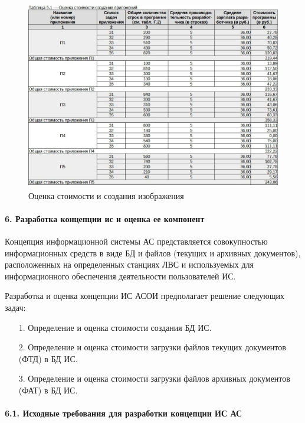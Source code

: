 \documentclass[12pt, a4paper, simple]{eskdtext}
\begin{document}
    \begin{figure}[ph!]
        \centering
        \includegraphics[width=16cm]
            {_docs/Таблица5-1ОценкаСтоимостиСозданияПриложений.jpg}
        \caption{Оценка стоимости и создания изображения}
    \end{figure}

    \newpage

    \paragraph{6. Разработка концепции ис и оценка ее компонент} \hspace{0pt}

    Концепция информационной системы АС представляется совокупностью информационных средств в виде БД и файлов (текущих и архивных документов), расположенных на определенных стан­циях ЛВС и используемых для информационного обеспечения деятельности пользователей ИС.

    Разработка и оценка концепции ИС АСОИ предполагает ре­шение следую­щих задач:
    \begin{enumerate}
        \item[1.] Определение и оценка стоимости создания БД ИС.
        \item[2.] Определение и оценка стоимости загрузки файлов текущих документов (ФТД) в БД ИС.
        \item[3.] Определение и оценка стоимости загрузки файлов архивных документов (ФАТ) в БД ИС.
    \end{enumerate}

    \paragraph{6.1. Исходные требования для разработки концепции ИС АС} \hspace{0pt}
\end{document}
